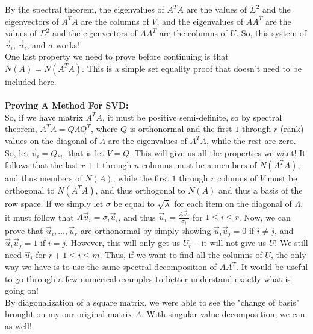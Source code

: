 \documentclass[12pt]{amsart}
\begin{document}
By the spectral theorem, the eigenvalues of $A^TA$ are the values of $\Sigma^2$ and the eigenvectors of $A^TA$ are the columns of $V$, and the eigenvalues of $AA^T$ are the values of $\Sigma^2$ and the eigenvectors of $AA^T$ are the columns of $U$. So, this system of $\vec{v}_i$, $\vec{u}_i$, and $\sigma$ works!\\
One last property we need to prove before continuing is that $N(A) = N(A^TA)$. This is a simple set equality proof that doesn't need to be included here.\\
\\
\textbf{Proving A Method For SVD:}\\
So, if we have matrix $A^TA$, it must be positive semi-definite, so by spectral theorem, $A^TA = Q \Lambda Q^T$, where $Q$ is orthonormal and the first $1$ through $r$ (rank) values on the diagonal of $\Lambda$ are the eigenvalues of $A^TA$, while the rest are zero. So, let $\vec{v}_i = Q_{*i}$, that is let $V = Q$. This will give us all the properties we want! It follows that the last $r+1$ through $n$ columns must be a members of $N(A^TA)$, and thus members of $N(A)$, while the first $1$ through $r$ columns of $V$ must be orthogonal to $N(A^TA)$, and thus orthogonal to $N(A)$ and thus a basis of the row space. If we simply let $\sigma$ be equal to $\sqrt{\lambda}$ for each item on the diagonal of $\Lambda$, it must follow that $A\vec{v}_i = \sigma_i \vec{u}_i$, and thus $\vec{u}_i = \frac{A\vec{v}_i}{\sigma_i}$ for $1 \leq i \leq r$. Now, we can prove that $\vec{u}_i, \dots, \vec{u}_r$ are orthonormal by simply showing $\vec{u}_i\vec{u}_j = 0$ if $i \neq j$, and $\vec{u}_i\vec{u}_j = 1$ if $i = j$. However, this will only get us $U_r$ -- it will not give us $U$! We still need $\vec{u}_i$ for $r+1 \leq i \leq m$. Thus, if we want to find all the columns of $U$, the only way we have is to use the same spectral decomposition of $AA^T$. It would be useful to go through a few numerical examples to better understand exactly what is going on!\\
By diagonalization of a square matrix, we were able to see the "change of basis" brought on my our original matrix $A$. With singular value decomposition, we can as well!
\end{document}
